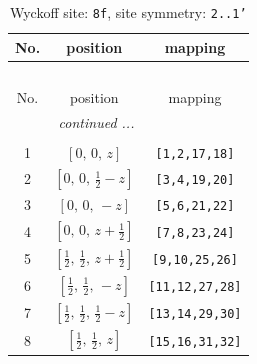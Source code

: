 \documentclass[fleqn,8pt]{jsarticle}
\begin{document}
\begin{longtable}{ccc}
\caption{Wyckoff site: {\tt 8f}, site symmetry: {\tt 2..1'}}
 \\
 \hline \hline
No. & position & mapping \\ \hline \endfirsthead

\multicolumn{2}{l}{\tablename\ \thetable{}} \\
 \hline \hline
No. & position & mapping \\ \hline \endhead

 \hline \hline
\multicolumn{2}{r}{\footnotesize\it continued ...} \\ \endfoot

 \hline \hline
\multicolumn{2}{r}{} \\ \endlastfoot

1 & $\left[ 0,\, 0,\, z \right]$ & {\tt [1,2,17,18]} \\ \hline
2 & $\left[ 0,\, 0,\, \frac{1}{2} - z \right]$ & {\tt [3,4,19,20]} \\ \hline
3 & $\left[ 0,\, 0,\, - z \right]$ & {\tt [5,6,21,22]} \\ \hline
4 & $\left[ 0,\, 0,\, z + \frac{1}{2} \right]$ & {\tt [7,8,23,24]} \\ \hline
5 & $\left[ \frac{1}{2},\, \frac{1}{2},\, z + \frac{1}{2} \right]$ & {\tt [9,10,25,26]} \\ \hline
6 & $\left[ \frac{1}{2},\, \frac{1}{2},\, - z \right]$ & {\tt [11,12,27,28]} \\ \hline
7 & $\left[ \frac{1}{2},\, \frac{1}{2},\, \frac{1}{2} - z \right]$ & {\tt [13,14,29,30]} \\ \hline
8 & $\left[ \frac{1}{2},\, \frac{1}{2},\, z \right]$ & {\tt [15,16,31,32]} \\
\end{longtable}
\renewcommand{\arraystretch}{1.2}
\end{document}
